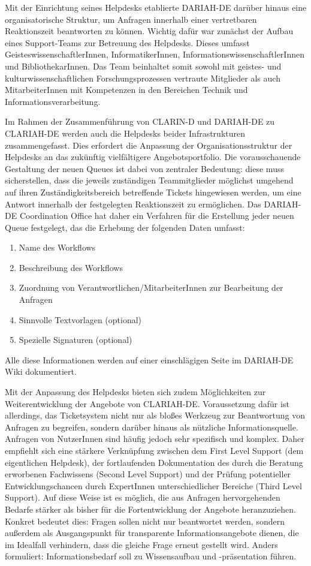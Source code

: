 \documentclass[a4paper,
fontsize=11pt,
oneside,
numbers=noperiodatend,
parskip=half-,
bibliography=totoc,
final
]{scrartcl}
\begin{document}
Mit der Einrichtung seines Helpdesks etablierte DARIAH-DE darüber hinaus
eine organisatorische Struktur, um Anfragen innerhalb einer vertretbaren
Reaktionszeit beantworten zu können. Wichtig dafür war zunächst der
Aufbau eines Support-Teams zur Betreuung des Helpdesks. Dieses umfasst
GeisteswissenschaftlerInnen, InformatikerInnen,
InformationswissenschaftlerInnen und BibliothekarInnen. Das Team
beinhaltet somit sowohl mit geistes- und kulturwissenschaftlichen
Forschungsprozessen vertraute Mitglieder als auch MitarbeiterInnen mit
Kompetenzen in den Bereichen Technik und Informationsverarbeitung.

Im Rahmen der Zusammenführung von CLARIN-D und DARIAH-DE zu CLARIAH-DE
werden auch die Helpdesks beider Infrastrukturen zusammengefasst. Dies
erfordert die Anpassung der Organisationsstruktur der Helpdesks an das
zukünftig vielfältigere Angebotsportfolio. Die vorausschauende
Gestaltung der neuen Queues ist dabei von zentraler Bedeutung: diese
muss sicherstellen, dass die jeweils zuständigen Teammitglieder
möglichst umgehend auf ihren Zuständigkeitsbereich betreffende Tickets
hingewiesen werden, um eine Antwort innerhalb der festgelegten
Reaktionszeit zu ermöglichen. Das DARIAH-DE Coordination Office hat
daher ein Verfahren für die Erstellung jeder neuen Queue festgelegt, das
die Erhebung der folgenden Daten umfasst:

\begin{enumerate}
\def\labelenumi{\arabic{enumi}.}
\item
  Name des Workflows
\item
  Beschreibung des Workflows
\item
  Zuordnung von Verantwortlichen/MitarbeiterInnen zur Bearbeitung der
  Anfragen
\item
  Sinnvolle Textvorlagen (optional)
\item
  Spezielle Signaturen (optional)
\end{enumerate}

Alle diese Informationen werden auf einer einschlägigen Seite im
DARIAH-DE Wiki dokumentiert.

Mit der Anpassung des Helpdesks bieten sich zudem Möglichkeiten zur
Weiterentwicklung der Angebote von CLARIAH-DE. Voraussetzung dafür ist
allerdings, das Ticketsystem nicht nur als bloßes Werkzeug zur
Beantwortung von Anfragen zu begreifen, sondern darüber hinaus als
nützliche Informationsquelle. Anfragen von NutzerInnen sind häufig
jedoch sehr spezifisch und komplex. Daher empfiehlt sich eine stärkere
Verknüpfung zwischen dem First Level Support (dem eigentlichen
Helpdesk), der fortlaufenden Dokumentation des durch die Beratung
erworbenen Fachwissens (Second Level Support) und der Prüfung
potentieller Entwicklungschancen durch ExpertInnen unterschiedlicher
Bereiche (Third Level Support). Auf diese Weise ist es möglich, die aus
Anfragen hervorgehenden Bedarfe stärker als bisher für die
Fortentwicklung der Angebote heranzuziehen. Konkret bedeutet dies:
Fragen sollen nicht nur beantwortet werden, sondern außerdem als
Ausgangspunkt für transparente Informationsangebote dienen, die im
Idealfall verhindern, dass die gleiche Frage erneut gestellt wird.
Anders formuliert: Informationsbedarf soll zu Wissensaufbau und
-präsentation führen.
\end{document}

